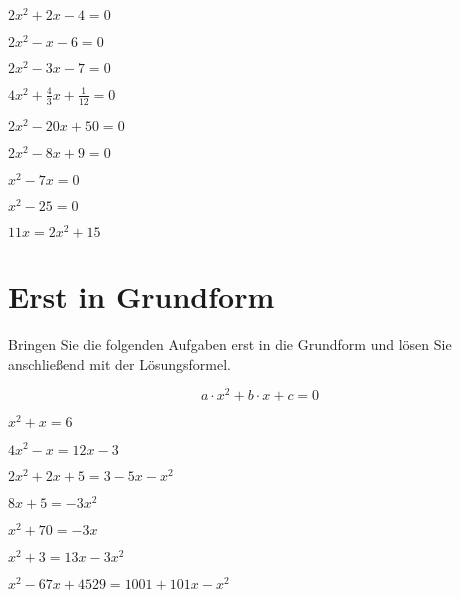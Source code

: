 \begin{bbwAufgabenBlock}
\item $2x^2+2x -4 = 0$

\item $2x^2 - x - 6 = 0$

\item $2x^2-3x-7 = 0$

\item $4x^2+\frac43 x + \frac1{12} =0 $

\item $ 2x^2 -20x + 50 = 0 $
\LoesungsBlock{$\lx=\left\{ 5 \right\}$}

\item $2x^2 -8x +9 =0 $
\LoesungsBlock{$\lx=\left\{  \right\}$}

\item $ x^2-7x= 0$

\item $ x^2-25 =0 $

\item $11x=2x^2+15 $


\end{bbwAufgabenBlock}
\newpage
\section{Erst in Grundform}
Bringen Sie die folgenden Aufgaben erst in die Grundform und lösen Sie anschließend mit der Lösungsformel.

$$a\cdot{}x^2 + b\cdot{}x + c = 0$$

\begin{bbwAufgabenBlock}
\item $ x^2+x= 6$

\item $4x^2-x =12x-3 $

\item $ 2x^2+2x+5 = 3-5x-x^2 $

\item $ 8x + 5 = -3x^2 $

\item $x^2 + 70 = -3x$
\LoesungsBlock{$\lx=\left\{    \right\}$}

\item $ x^2+3= 13x-3x^2$

\item $x^2 -67x + 4529 = 1001 + 101x - x^2$

\end{bbwAufgabenBlock}
\newpage
